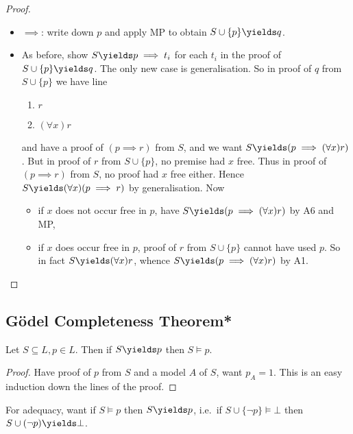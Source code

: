 \documentclass[a4paper]{article}
\begin{document}
\begin{proof}\leavevmode
  \begin{itemize}
  \item \(\implies\): write down \(p\) and apply MP to obtain \(S \cup \{p\} \yields q\).
  \item As before, show \(S \yields p \implies t_i\) for each \(t_i\) in the proof of \(S \cup \{p\} \yields q\). The only new case is generalisation. So in proof of \(q\) from \(S \cup \{p\}\) we have line
    \begin{enumerate}
    \item \(r\)
    \item \((\forall x) r\)
    \end{enumerate}
    and have a proof of \((p \implies r)\) from \(S\), and we want \(S \yields (p \implies (\forall x) r)\). But in proof of \(r\) from \(S \cup \{p\}\), no premise had \(x\) free. Thus in proof of \((p \implies r)\) from \(S\), no proof had \(x\) free either. Hence \(S \yields (\forall x) (p \implies r)\) by generalisation. Now
    \begin{itemize}
    \item if \(x\) does not occur free in \(p\), have \(S \yields (p \implies (\forall x) r)\) by A6 and MP,
    \item if \(x\) does occur free in \(p\), proof of \(r\) from \(S \cup \{p\}\) cannot have used \(p\). So in fact \(S \yields (\forall x)r\), whence \(S \yields (p \implies (\forall x)r)\) by A1.
    \end{itemize}
  \end{itemize}
\end{proof}

\subsection{Gödel Completeness Theorem*}

\begin{proposition}[Soundness]
  Let \(S \subseteq L, p \in L\). Then if \(S \yields p\) then \(S \models p\).
\end{proposition}

\begin{proof}
  Have proof of \(p\) from \(S\) and a model \(A\) of \(S\), want \(p_A = 1\). This is an easy induction down the lines of the proof.
\end{proof}

For adequacy, want if \(S \models p\) then \(S \yields p\), i.e.\ if \(S \cup \{\neg p\} \models \bot\) then \(S \cup (\neg p) \yields \bot\).
\end{document}
